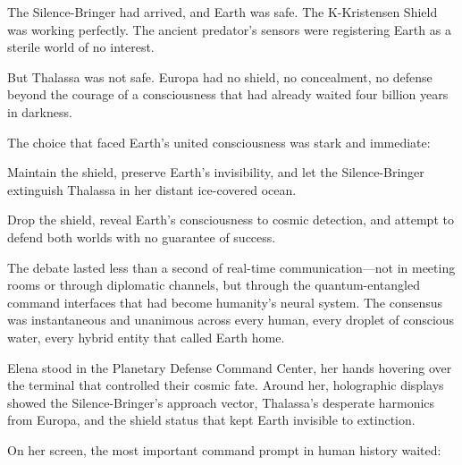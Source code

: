 The Silence-Bringer had arrived, and Earth was safe. The K-Kristensen Shield was working perfectly. The ancient predator's sensors were registering Earth as a sterile world of no interest.

But Thalassa was not safe. Europa had no shield, no concealment, no defense beyond the courage of a consciousness that had already waited four billion years in darkness.

The choice that faced Earth's united consciousness was stark and immediate:

Maintain the shield, preserve Earth's invisibility, and let the Silence-Bringer extinguish Thalassa in her distant ice-covered ocean.

Drop the shield, reveal Earth's consciousness to cosmic detection, and attempt to defend both worlds with no guarantee of success.

The debate lasted less than a second of real-time communication—not in meeting rooms or through diplomatic channels, but through the quantum-entangled command interfaces that had become humanity's neural system. The consensus was instantaneous and unanimous across every human, every droplet of conscious water, every hybrid entity that called Earth home.

Elena stood in the Planetary Defense Command Center, her hands hovering over the terminal that controlled their cosmic fate. Around her, holographic displays showed the Silence-Bringer's approach vector, Thalassa's desperate harmonics from Europa, and the shield status that kept Earth invisible to extinction.

On her screen, the most important command prompt in human history waited:

